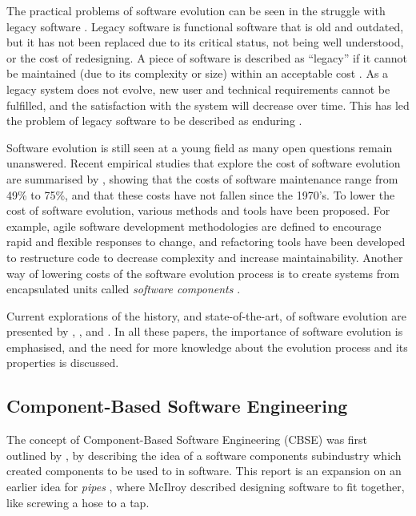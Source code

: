 The practical problems of software evolution can be seen in the struggle with legacy software \citep{Bennett1995}.
Legacy software is functional software that is old and outdated, but it has not been replaced due to its critical status, not being well understood, or the cost of redesigning.
A piece of software is described as ``legacy'' if it cannot be maintained  (due to its complexity or size) within an acceptable cost \citep{Bisbal1999}.
As a legacy system does not evolve, new user and technical requirements cannot be fulfilled, and the satisfaction with the system will decrease over time.
This has led the problem of legacy software to be described as enduring \citep{Bennett2000}. 

Software evolution is still seen at a young field \citep{Godfrey2008} as many open questions remain unanswered.
Recent empirical studies that explore the cost of software evolution are summarised by \cite{Grubb2003}, 
showing that the costs of software maintenance range from 49\% to 75\%, and that these costs have not fallen since the 1970's. 
To lower the cost of software evolution, various methods and tools have been proposed.
For example, agile software development methodologies \citep{beck2001manifesto} are defined to encourage rapid and flexible responses to change,
and refactoring tools \citep{fowler1999refactoring} have been developed to restructure code to decrease complexity and increase maintainability. 
Another way of lowering costs of the software evolution process is to create systems from encapsulated units called \textit{software components} \citep{Szyperski2002}.

Current explorations of the history, and state-of-the-art, of software evolution are presented by \cite{Bennett2000}, \cite{Lehman2003}, and \cite{Godfrey2008}.
In all these papers, the importance of software evolution is emphasised, and the need for more knowledge about the evolution process and its properties is discussed.

\subsection{Component-Based Software Engineering}
The concept of Component-Based Software Engineering (CBSE) was first outlined by \cite{McIlroy1969}, 
by describing the idea of a software components subindustry which created components to be used to in software.
This report is an expansion on an earlier idea for \textit{pipes} \citep{mcilroy1964pipes}, 
where McIlroy described designing software to fit together, like screwing a hose to a tap.

